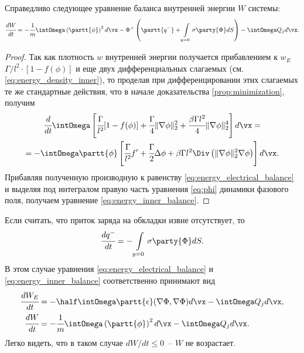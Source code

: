 \begin{proposition}
\label{prop:energy_inner_balance}
Справедливо следующее уравнение баланса внутренней энергии $W$ системы:
\begin{equation}
    \cfrac{dW}{dt} = -\cfrac{1}{m} \intOmega \left( \partt{\phi} \right)^2 d \vx - \Phi^+ \left( \partt{q^-} + \int\limits_{y = 0} \sigma \party{\Phi} dS \right) - \intOmega Q_j d \vx.
    \label{eq:energy_inner_balance}
\end{equation}
\end{proposition}
\begin{proof}
Так как плотность $w$ внутренней энергии получается прибавлением к $w_E$ $\Gamma / l^2 \cdot [1 - f(\phi)]$ и еще двух дифференциальных слагаемых (см. \eqref{eq:energy_density_inner}), то проделав при дифференцировании этих слагаемых те же стандартные действия, что в начале доказательства \ref{prop:minimization}, получим
\begin{multline*}
    \cfrac{d}{dt} \intOmega \left[ \cfrac{\Gamma}{l^2}[1 - f(\phi)] + \cfrac{\Gamma}{4} \| \nabla \phi \|_2^2 + \cfrac{\beta \Gamma l^2}{4} \| \nabla \phi \|_2^4 \right] d \vx = \\ = - \intOmega \partt{\phi} \left[ \cfrac{\Gamma}{l^2} f' + \cfrac{\Gamma}{2} \Delta \phi + \beta \Gamma l^2 \Div \left( \| \nabla \phi \|_2^2 \nabla \phi \right) \right] d \vx.
\end{multline*}
Прибавляя полученную производную к равенству \eqref{eq:energy_electrical_balance} и выделяя под интегралом правую часть уравнения \eqref{eq:phi} динамики фазового поля, получаем уравнение \eqref{eq:energy_inner_balance}.
\end{proof}

\begin{remark}
\label{rem:charge_conservative}
Если считать, что приток заряда на обкладки извне отсутствует, то
\[
    \cfrac{d q^-}{dt} = -\int\limits_{y = 0} \sigma \party{\Phi} dS.
\]
В этом случае уравнения \eqref{eq:energy_electrical_balance} и \eqref{eq:energy_inner_balance} соответственно принимают вид
\begin{align*}
    \cfrac{d W_E}{dt} & = -\half \intOmega \partt{\epsilon} (\nabla \Phi, \nabla \Phi) d \vx - \intOmega Q_j d \vx, \\
    \cfrac{dW}{dt} & = -\cfrac{1}{m} \intOmega \left( \partt{\phi} \right)^2 d \vx - \intOmega Q_j d \vx.
\end{align*}
Легко видеть, что в таком случае $dW / dt \leq 0$~-- $W$ не возрастает.
\end{remark}

